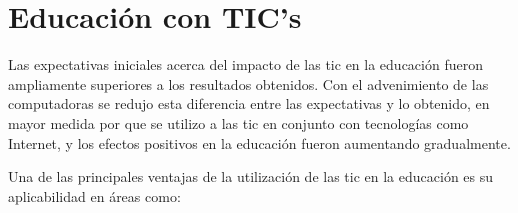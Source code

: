 \section{Educación con TIC's}
\label{sec:tics_EDUCACION_TICS}

Las expectativas iniciales acerca del impacto de las \Gls{tic} en la educación
fueron ampliamente superiores a los resultados obtenidos\cite{unesco:ict}. Con
el advenimiento de las computadoras se redujo esta diferencia entre las expectativas 
y lo obtenido, en mayor medida por que se utilizo a las \Gls{tic} en conjunto con 
tecnologías como Internet, y los efectos positivos en la educación fueron aumentando
gradualmente\cite{unesco:ict}.

Una de las principales ventajas de la utilización de las \Gls{tic} en la educación es
su aplicabilidad en áreas como:

